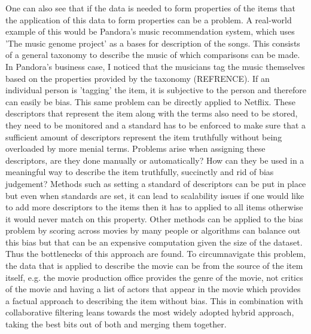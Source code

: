 \documentclass[a4paper]{article}
\begin{document}
One can also see that if the data is needed to form properties of the items that the application of this data to form properties can be a problem. A real-world example of this would be Pandora's music recommendation system, which uses 'The music genome project' as a bases for description of the songs. This consists of a general taxonomy to describe the music of which comparisons can be made. In Pandora's business case, I noticed that the musicians tag the music themselves based on the properties provided by the taxonomy (REFRENCE). If an individual person is 'tagging' the item, it is subjective to the person and therefore can easily be bias. This same problem can be directly applied to Netflix. These descriptors that represent the item along with the terms also need to be stored, they need to be monitored and a standard has to be enforced to make sure that a sufficient amount of descriptors represent the item truthfully without being overloaded by more menial terms. Problems arise when assigning these descriptors, are they done manually or automatically? How can they be used in a meaningful way to describe the item truthfully, succinctly and rid of bias judgement? Methods such as setting a standard of descriptors can be put in place but even when standards are set, it can lead to scalability issues if one would like to add more descriptors to the items then it has to applied to all items otherwise it would never match on this property. Other methods can be applied to the bias problem by scoring across movies by many people or algorithms can balance out this bias but that can be an expensive computation given the size of the dataset. Thus the bottlenecks of this approach are found. To circumnavigate this problem, the data that is applied to describe the movie can be from the source of the item itself, e.g. the movie production office provides the genre of the movie, not critics of the movie and having a list of actors that appear in the movie which provides a factual approach to describing the item without bias. This in combination with collaborative filtering leans towards the most widely adopted hybrid approach, taking the best bits out of both and merging them together.
\end{document}
